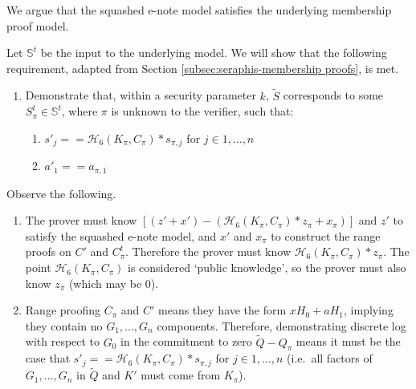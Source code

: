 \begin{appendices}
We argue that the squashed e-note model satisfies the underlying membership proof model.

Let $\mathbb{S}^t$ be the input to the underlying model. We will show that the following requirement, adapted from Section \ref{subsec:seraphis-membership proofs}, is met.

\begin{enumerate}
    \item Demonstrate that, within a security parameter $k$, $\tilde{S}$ corresponds to some $S^t_{\pi} \in \mathbb{S}^t$, where $\pi$ is unknown to the verifier, such that:
    \begin{enumerate}
        \item $s'_j == \mathcal{H}_6(K_{\pi}, C_{\pi})*s_{\pi,j}$ for $j \in 1,...,n$
        \item $a'_1 == a_{\pi,1}$
    \end{enumerate}
\end{enumerate}

Observe the following.

\begin{enumerate}
    \item The prover must know $[(z' + x') - (\mathcal{H}_6(K_{\pi}, C_{\pi})*z_{\pi} + x_{\pi})]$ and $z'$ to satisfy the squashed e-note model, and $x'$ and $x_{\pi}$ to construct the range proofs on $C'$ and $C^t_{\pi}$. Therefore the prover must know $\mathcal{H}_6(K_{\pi}, C_{\pi})*z_{\pi}$. The point $\mathcal{H}_6(K_{\pi}, C_{\pi})$ is considered `public knowledge', so the prover must also know $z_{\pi}$ (which may be 0).

    \item Range proofing $C_{\pi}$ and $C'$ means they have the form $x H_0 + a H_1$, implying they contain no $G_1,...,G_n$ components. Therefore, demonstrating discrete log with respect to $G_0$ in the commitment to zero $\tilde{Q} - Q_{\pi}$ means it must be the case that $s'_j == \mathcal{H}_6(K_{\pi}, C_{\pi})*s_{\pi,j}$ for $j \in 1,...,n$ (i.e.\ all factors of $G_1,...,G_n$ in $\tilde{Q}$ and $K'$ must come from $K_{\pi}$).


\end{enumerate}
\end{appendices}
